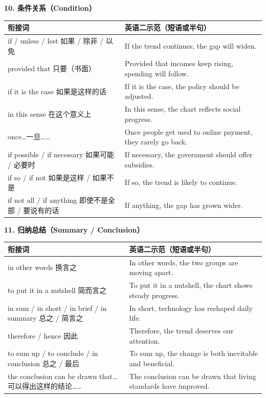 \documentclass[11pt,a4paper]{ctexart}
\begin{document}
\par\addvspace{6pt}\noindent\textbf{10. 条件关系（Condition）}\par\addvspace{2pt}
\begin{longtable}{L{5.4cm}L{10.6cm}}
\toprule
\textbf{衔接词} & \textbf{英语二示范（短语或半句）} \\
\midrule
\endhead
if / unless / lest 如果 / 除非 / 以免 & If the trend continues, the gap will widen. \\
provided that 只要（书面） & Provided that incomes keep rising, spending will follow. \\
if it is the case 如果是这样的话 & If it is the case, the policy should be adjusted. \\
in this sense 在这个意义上 & In this sense, the chart reflects social progress. \\
once\ldots 一旦…… & Once people get used to online payment, they rarely go back. \\
if possible / if necessary 如果可能 / 必要时 & If necessary, the government should offer subsidies. \\
if so / if not 如果是这样 / 如果不是 & If so, the trend is likely to continue. \\
if not all / if anything 即使不是全部 / 要说有的话 & If anything, the gap has grown wider. \\
\bottomrule
\end{longtable}

\par\addvspace{6pt}\noindent\textbf{11. 归纳总结（Summary / Conclusion）}\par\addvspace{2pt}
\begin{longtable}{L{5.4cm}L{10.6cm}}
\toprule
\textbf{衔接词} & \textbf{英语二示范（短语或半句）} \\
\midrule
\endhead
in other words 换言之 & In other words, the two groups are moving apart. \\
to put it in a nutshell 简而言之 & To put it in a nutshell, the chart shows steady progress. \\
in sum / in short / in brief / in summary 总之 / 简言之 & In short, technology has reshaped daily life. \\
therefore / hence 因此 & Therefore, the trend deserves our attention. \\
to sum up / to conclude / in conclusion 总之 / 最后 & To sum up, the change is both inevitable and beneficial. \\
the conclusion can be drawn that\ldots 可以得出这样的结论…… & The conclusion can be drawn that living standards have improved. \\
\bottomrule
\end{longtable}
\end{document}
